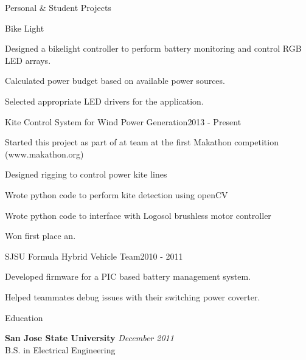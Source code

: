 \documentclass{resume} %
\begin{document}
\begin{rSection}{Personal \& Student Projects}

\begin{rProject}{Bike Light}{}
\item Designed a bikelight controller to perform battery monitoring and control RGB LED arrays.
\item Calculated power budget based on available power sources.
\item Selected appropriate LED drivers for the application.
\end{rProject}

\begin{rProject}{Kite Control System for Wind Power Generation}{2013 - Present}
\item Started this project as part of at team at the first Makathon competition (www.makathon.org)
\item Designed rigging to control power kite lines 
\item Wrote python code to perform kite detection using openCV
\item Wrote python code to interface with Logosol brushless motor controller
\item Won first place an.
\end{rProject}

\begin{rProject}{SJSU Formula Hybrid Vehicle Team}{2010 - 2011}
\item Developed firmware for a PIC based battery management system.
\item Helped teammates debug issues with their switching power coverter.
\end{rProject}

\end{rSection}


\begin{rSection}{Education}

{\bf San Jose State University} \hfill {\em December 2011} \\ 
B.S. in Electrical Engineering \\

\end{rSection}





\end{document}

